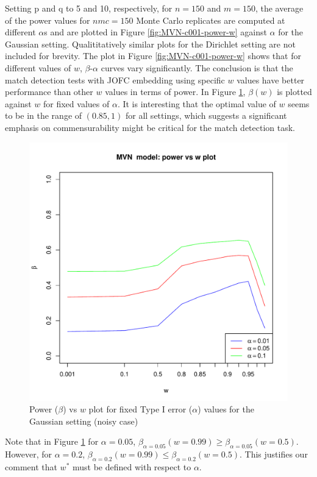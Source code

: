 \documentclass[11pt]{article} %
\begin{document}
Setting p and q to 5 and 10, respectively, for $n=150$ and $m=150$, the average of the power values for $nmc=150$ Monte Carlo replicates are computed at  different $\alpha$s and are plotted in Figure \ref{fig:MVN-c001-power-w} against $\alpha$ for the Gaussian setting.  Qualititatively similar plots for the Dirichlet setting  are not included for brevity.  The plot in Figure \ref{fig:MVN-c001-power-w} shows that for different values of  $w$, $\beta$-$\alpha$ curves vary significantly.  The conclusion is that the match detection tests with JOFC embedding using specific $w$ values have better performance than other $w$ values in terms of power.  In Figure \ref{fig:MVN-c001-beta-w},  $\beta(w)$ is plotted against $w$ for fixed values of $\alpha$. It is  interesting that the optimal value of $w$ seems to be in the range of $(0.85,1)$ for all settings, which suggests a significant emphasis on commensurability might be  critical for the match detection  task. 

\begin{figure}
\includegraphics[scale=0.65]{OOSMVN-power-w-c001.pdf}
\caption{Power ($\beta$) vs $w$ plot for fixed Type I error ($\alpha$) values for the Gaussian setting (noisy case)}
\label{fig:MVN-c001-beta-w}
\end{figure}
Note that in Figure \ref{fig:MVN-c001-beta-w} for $\alpha=0.05$, $\beta_{\alpha=0.05}(w=0.99)\geq\beta_{\alpha=0.05}(w=0.5)$. However, for $\alpha=0.2$, $\beta_{\alpha=0.2}(w=0.99)\leq\beta_{\alpha=0.2}(w=0.5)$. This justifies our comment that  $w^{*}$  must be defined with respect to $\alpha$.
\end{document}
